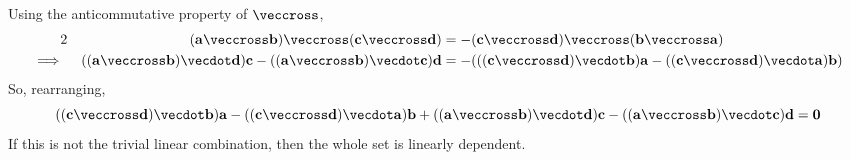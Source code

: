 \documentclass[fleqn,a4paper,11pt]{article}
\begin{document}
\begin{enumerate}
\begin{enumerate}
      Using the anticommutative property of \(\veccross\),
      \begin{alignat*}2
       && (\vec a \veccross \vec b) \veccross (\vec c \veccross \vec d) &=
          - (\vec c \veccross \vec d) \veccross (\vec b \veccross \vec a) \\
       \implies{}&&
          ((\vec a \veccross \vec b) \vecdot \vec d)\vec c
          - ((\vec a \veccross \vec b) \vecdot \vec c)\vec d &=
          -( ((\vec c \veccross \vec d) \vecdot \vec b)\vec a
             - ((\vec c \veccross \vec d) \vecdot \vec a)\vec b)
      \end{alignat*}
      So, rearranging,
      \begin{equation*}
       ((\vec c \veccross \vec d) \vecdot \vec b)\vec a
       - ((\vec c \veccross \vec d) \vecdot \vec a)\vec b
       + ((\vec a \veccross \vec b) \vecdot \vec d)\vec c
       - ((\vec a \veccross \vec b) \vecdot \vec c)\vec d = \vec 0
      \end{equation*}
      If this is not the trivial linear combination, then the whole set is
      linearly dependent.


\end{enumerate}
\end{enumerate}
\end{document}
